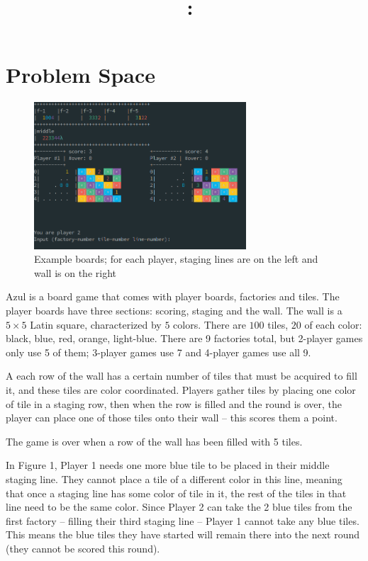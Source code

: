 \documentclass[12pt]{article}
\title{
    \vspace{2in}
    \textmd{\textbf{\tit}}\\
    \normalsize\vspace{0.1in}\small{\course \ : \term }\\
    \vspace{0.1in}\large{\textit{\auths}}
    \vspace{3in}
}
\date{}
\begin{document}
\maketitle
\pagebreak

\section{Problem Space}

\begin{figure}
    \begin{center}
        \includegraphics[width=79mm]{images/i3.png}
        \caption{Example boards; for each player, staging lines are on the left and wall is on the right}
        \label{i3}
    \end{center}
\end{figure}

Azul is a board game that comes with player boards, factories and tiles. 
The player boards have three sections: scoring, staging and the wall. 
The wall is a $5 \times 5$ Latin square, characterized by $5$ colors. 
There are $100$ tiles, $20$ of each color: black, blue, red, orange, light-blue. 
There are 9 factories total, but 2-player games only use 5 of them; 3-player games use 7 and 4-player games use all 9. 


A each row of the wall has a certain number of tiles that must be acquired to fill it, and these tiles
are color coordinated.  Players gather tiles by placing one color of tile in a staging row, then when the row is filled and the round is over, the player can place one of those tiles onto their wall -- this scores them a point.

The game is over when a row of the wall has been filled with 5 tiles. 


In Figure 1,  Player 1 needs one more blue tile to be placed in their middle staging line.
They cannot place a tile of a different color in this line, meaning that once a staging 
line has some color of tile in it, the rest of the tiles in that line need to be the 
same color. Since Player 2 can take the 2 blue tiles from the first factory 
-- filling their third staging line -- Player 1 cannot take any blue tiles. 
This means the blue tiles they have started will remain there into the next 
round (they cannot be scored this round).
\end{document}
